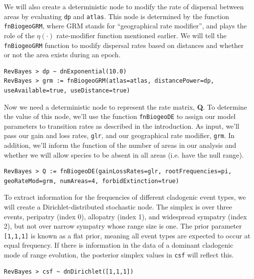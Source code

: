 \documentclass[11pt]{article}
\begin{document}
We will also create a deterministic node to modify the rate of dispersal between areas by evaluating {\tt dp} and {\tt atlas}.
This node is determined by the function {\tt fnBiogeoGRM}, where GRM stands for ``geographical rate modifier'', and plays the role of the $\eta(\cdot)$ rate-modifier function mentioned earlier.
We will tell the {\tt fnBiogeoGRM} function to modify dispersal rates based on distances and whether or not the area exists during an epoch.

\begin{snugshade}
\begin{lstlisting}
RevBayes > dp ~ dnExponential(10.0)
RevBayes > grm := fnBiogeoGRM(atlas=atlas, distancePower=dp, useAvailable=true, useDistance=true)
\end{lstlisting}
\end{snugshade}

Now we need a deterministic node to represent the rate matrix, {\bf Q}.
To determine the value of this node, we'll use the function {\tt fnBiogeoDE} to assign our model parameters to transition rates as described in the introduction.
As input, we'll pass our gain and loss rates, {\tt glr}, and our geographical rate modifier, {\tt grm}.
In addition, we'll inform the function of the number of areas in our analysis and whether we will allow species to be absent in all areas (i.e. have the null range).

\begin{snugshade}
\begin{lstlisting}
RevBayes > Q := fnBiogeoDE(gainLossRates=glr, rootFrequencies=pi, geoRateMod=grm, numAreas=4, forbidExtinction=true)
\end{lstlisting}
\end{snugshade}

To extract information for the frequencies of different cladogenic event types, we will create a Dirichlet-distributed stochastic node.
The simplex is over three events, peripatry (index 0), allopatry (index 1), and widespread sympatry (index 2), but not over narrow sympatry whose range size is one.
The prior parameter {\tt [1,1,1]} is known as a flat prior, meaning all event types are expected to occur at equal frequency.
If there is information in the data of a dominant cladogenic mode of range evolution, the posterior simplex values in {\tt csf} will reflect this.

\begin{snugshade}
\begin{lstlisting}
RevBayes > csf ~ dnDirichlet([1,1,1])
\end{lstlisting}
\end{snugshade}
\end{document}
